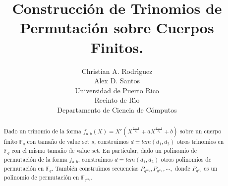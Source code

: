 \documentclass{article}
\theoremstyle{definition}
\theoremstyle{remark}
\numberwithin{equation}{section}
\begin{document}
\title{Construcci\'{o}n de Trinomios de Permutaci\'{o}n sobre Cuerpos Finitos.}
\author{Christian A. Rodr\'{\i}guez \\ Alex D. Santos \\ Universidad de Puerto Rico \\ Recinto de R\'{\i}o \\ Departamento de Ciencia de C\'{o}mputos}

\maketitle

\begin{abstract}
Dado un trinomio de la forma $f_{a,b}(X)=X^r( X^{\frac{q-1}{d_1}}+aX^{\frac{q-1}{d_2}}+b )$ sobre un cuerpo finito $\mathbb{F}_q$ con tama\~{n}o de value set $s$, constru\'{\i}mos $d=lcm(d_1, d_2)$ otros trinomios en $\mathbb{F}_q$ con el mismo tama\~{n}o de value set. En particular, dado un polinomio de permutaci\'{o}n de la forma $f_{a,b}$, constru\'{\i}mos $d=lcm(d_1,d_2)$ otros polinomios de permutaci\'{o}n en $\mathbb{F}_q$. Tambi\'{e}n constru\'{\i}mos secuencias $P_{q^{m_1}}, P_{q^{m_2}}, \cdots,$ donde $P_{q^{m_i}}$ es un polinomio de permutaci\'{o}n en $\mathbb{F}_{q^{m_i}}$.
\end{abstract}
\end{document}
